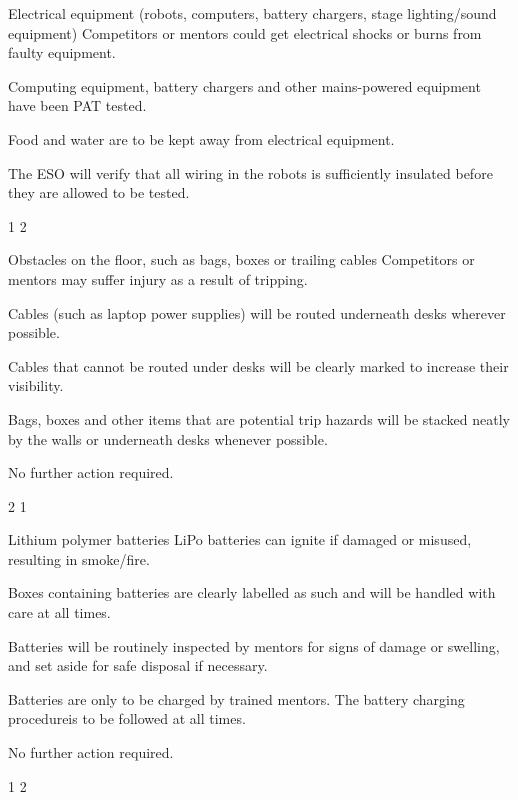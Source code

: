 {    \risk
        {Electrical equipment (robots, computers, battery chargers,
         stage lighting/sound equipment)}
        {Competitors or mentors could get electrical shocks or burns from faulty
         equipment.}
        {\item Computing equipment, battery chargers and other mains-powered
         equipment have been PAT tested.
         \item Food and water are to be kept away from electrical equipment.}
        {\item The ESO will verify that all wiring in the robots is sufficiently
         insulated before they are allowed to be tested.}
        {1} %
        {2} %

    \risk
        {Obstacles on the floor, such as bags, boxes or trailing cables}
        {Competitors or mentors may suffer injury as a result of tripping.}
        {\item Cables (such as laptop power supplies) will be routed underneath
         desks wherever possible.
         \item Cables that cannot be routed under desks will be clearly marked
         to increase their visibility.
         \item Bags, boxes and other items that are potential trip hazards will
         be stacked neatly by the walls or underneath desks whenever possible.}
        {\item No further action required.}
        {2} %
        {1} %

    \risk
        {Lithium polymer batteries}
        {LiPo batteries can ignite if damaged or misused, resulting in
         smoke/fire.}
        {\item Boxes containing batteries are clearly labelled as such and will
         be handled with care at all times.
         \item Batteries will be routinely inspected by mentors for signs of
         damage or swelling, and set aside for safe disposal if necessary.
         \item Batteries are only to be charged by trained mentors. The battery
         charging procedure\chargingfootnote is to be followed at all times.}
        {\item No further action required.}
        {1} %
        {2} %
}


\newcommand{\postrisks}{
    \subsection*{Risk of fire}

    To minimise the risk of fire resulting from this activity, food and drink
    will not be allowed near electrical equipment, and naked flames will be
    prohibited. The risk of fire occurring elsewhere in the building(s) is
    controlled primarily by the building operator\estatesfacilitiesfootnote.
    The ESO will ensure that all people present are informed of the locations of
    the exits and whether any fire drills are expected to take place.
}



